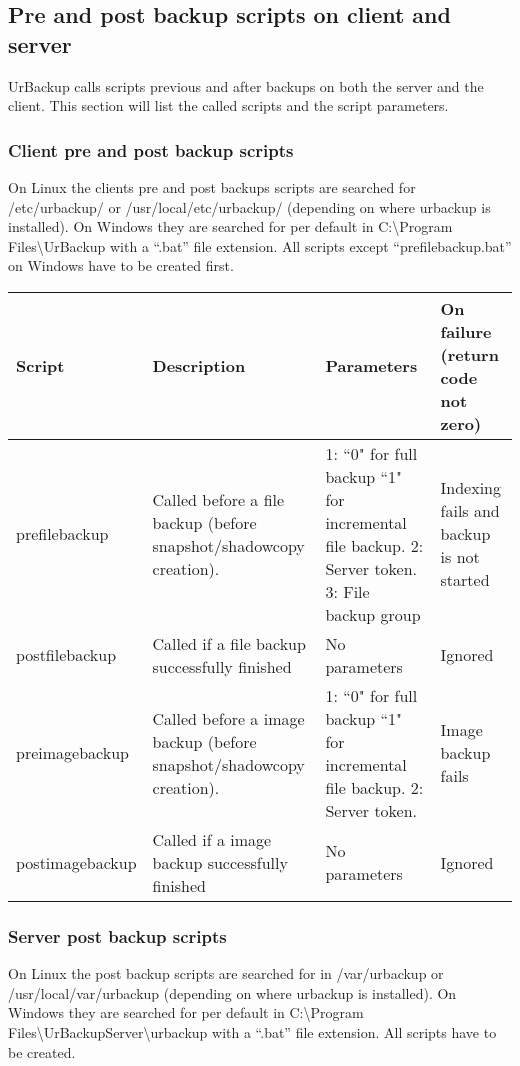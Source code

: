 \documentclass[a4paper,10pt]{article}
\begin{document}
\subsection{Pre and post backup scripts on client and server}

UrBackup calls scripts previous and after backups on both the server and the client. This section will list the called scripts and the script parameters.

\subsubsection{Client pre and post backup scripts}

On Linux the clients pre and post backups scripts are searched for /etc/urbackup/ or /usr/local/etc/urbackup/ (depending on where urbackup is installed).
On Windows they are searched for per default in C:\textbackslash Program Files\textbackslash UrBackup with a ``.bat'' file extension.
All scripts except ``prefilebackup.bat'' on Windows have to be created first.

\begin{tabular}{|p{}|p{}|p{}|p{}|}
\hline
Script & Description & Parameters & On failure (return code not zero)\\
\hline\hline
prefilebackup & Called before a file backup (before snapshot/shadowcopy creation). & 1: ``0" for full backup ``1" for incremental file backup. 2: Server token. 3: File backup group & Indexing fails and backup is not started\\
\hline
postfilebackup & Called if a file backup successfully finished & No parameters & Ignored\\ 
\hline
preimagebackup & Called before a image backup (before snapshot/shadowcopy creation). & 1: ``0" for full backup ``1" for incremental file backup. 2: Server token. & Image backup fails\\
\hline
postimagebackup & Called if a image backup successfully finished & No parameters & Ignored\\ 
\hline
\end{tabular}

\subsubsection{Server post backup scripts}

On Linux the post backup scripts are searched for in /var/urbackup or /usr/local/var/urbackup (depending on where urbackup is installed). On Windows they are searched for per default in C:\textbackslash Program Files\textbackslash UrBackupServer\textbackslash urbackup with a ``.bat'' file extension. All scripts have to be created.\\
\end{document}
